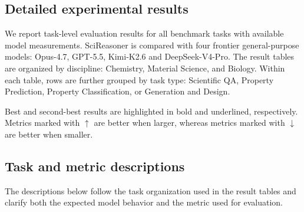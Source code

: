\begin{appendices}

 

 

\providecommand{\BestPerf}[1]{\textbf{#1}}
\providecommand{\SecBestPerf}[1]{\underline{#1}}

\section{Detailed experimental results}\label{secB1}

We report task-level evaluation results for all benchmark tasks with available model measurements. SciReasoner is compared with four frontier general-purpose models: Opus-4.7, GPT-5.5, Kimi-K2.6 and DeepSeek-V4-Pro. The result tables are organized by discipline: Chemistry, Material Science, and Biology. Within each table, rows are further grouped by task type: Scientific QA, Property Prediction, Property Classification, or Generation and Design.

Best and second-best results are highlighted in bold and underlined, respectively. Metrics marked with $\uparrow$ are better when larger, whereas metrics marked with $\downarrow$ are better when smaller. 

\subsection{Task and metric descriptions}\label{secB1_task_intro}

 
The descriptions below follow the task organization used in the result tables and clarify both the expected model behavior and the metric used for evaluation.


\end{appendices}
